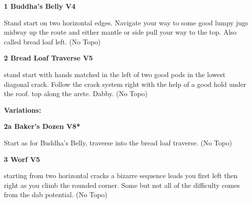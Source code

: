 \begin{multicols}{2}
\begin{minipage}{\columnwidth}
			\end{minipage}
			
					\begin{minipage}{\linewidth}	
					\label{rt:Buddha's Belly}
\colorbox{RoyalBlue!20}{
\parbox{0.95\textwidth}{
\textbf{
1 Buddha's Belly V4    
}
}
}

					\begin{adjustwidth}{0.5cm}{}				
					Stand start on two horizontal edges. Navigate your way to some good lumpy jugs midway up the route and either mantle or side pull your way to the top. Also called bread loaf left.
						\newline (No Topo) 
					\end{adjustwidth}
					\end{minipage}
					\begin{minipage}{\linewidth}	
					\label{rt:Bread Loaf Traverse}
\colorbox{RoyalBlue!20}{
\parbox{0.95\textwidth}{
\textbf{
2 Bread Loaf Traverse V5    
}
}
}

					\begin{adjustwidth}{0.5cm}{}				
					stand start with hands matched in the left of two good pods in the lowest diagonal crack. Follow the crack system right with the help of a good hold under the roof. top along the arete. Dabby.
						\newline (No Topo) 
					\end{adjustwidth}
					\end{minipage}
						\begin{adjustwidth}{0.5cm}{}				
						\textbf{Variations:} \newline
							\begin{minipage}{\linewidth}	
							\label{vr:Baker's Dozen}
\colorbox{Goldenrod!50}{
\parbox{0.95\textwidth}{
\textbf{
2a Baker's Dozen V8*  
}
}
}

							\begin{adjustwidth}{0.5cm}{}				
							Start as for Buddha's Belly, traverse into the bread loaf traverse.
								\newline (No Topo) 
							\end{adjustwidth}
							\end{minipage}
						\end{adjustwidth}
					\begin{minipage}{\linewidth}	
					\label{rt:Worf}
\colorbox{RoyalBlue!20}{
\parbox{0.95\textwidth}{
\textbf{
3 Worf V5    
}
}
}

					\begin{adjustwidth}{0.5cm}{}				
					starting from two horizontal cracks a bizarre sequence leads you first left then right as you climb the rounded corner. Some but not all of the difficulty comes from the dab potential.
						\newline (No Topo) 
					\end{adjustwidth}
					\end{minipage}
			\begin{minipage}{\columnwidth}

\end{minipage}
\end{multicols}
